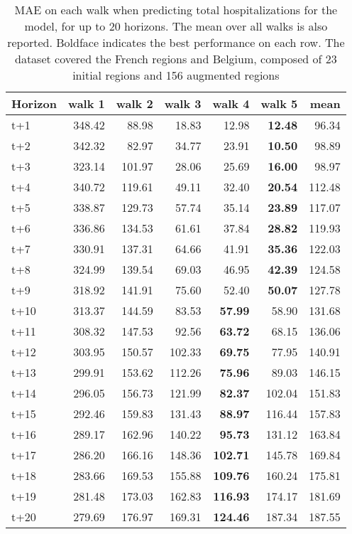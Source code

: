 \begin{table}[H]
\centering
\caption{MAE on each walk when predicting total hospitalizations for the model, for up to 20 horizons. The mean over all walks is also reported. Boldface indicates the best performance on each row. The dataset covered the French regions and Belgium, composed of 23 initial regions and 156 augmented regions }
\label{tab:MAE_walk_encoder_decoder}
\begin{tabular}{lrrrrrr}
\toprule
Horizon &  walk 1 &  walk 2 &  walk 3 &  walk 4 &  walk 5 &   mean \\
\midrule
t+1  & 348.42  & 88.98  & 18.83  & 12.98  & \textbf{12.48}  & 96.34  \\
t+2  & 342.32  & 82.97  & 34.77  & 23.91  & \textbf{10.50}  & 98.89  \\
t+3  & 323.14  & 101.97  & 28.06  & 25.69  & \textbf{16.00}  & 98.97  \\
t+4  & 340.72  & 119.61  & 49.11  & 32.40  & \textbf{20.54}  & 112.48  \\
t+5  & 338.87  & 129.73  & 57.74  & 35.14  & \textbf{23.89}  & 117.07  \\
t+6  & 336.86  & 134.53  & 61.61  & 37.84  & \textbf{28.82}  & 119.93  \\
t+7  & 330.91  & 137.31  & 64.66  & 41.91  & \textbf{35.36}  & 122.03  \\
t+8  & 324.99  & 139.54  & 69.03  & 46.95  & \textbf{42.39}  & 124.58  \\
t+9  & 318.92  & 141.91  & 75.60  & 52.40  & \textbf{50.07}  & 127.78  \\
t+10  & 313.37  & 144.59  & 83.53  & \textbf{57.99}  & 58.90  & 131.68  \\
t+11  & 308.32  & 147.53  & 92.56  & \textbf{63.72}  & 68.15  & 136.06  \\
t+12  & 303.95  & 150.57  & 102.33  & \textbf{69.75}  & 77.95  & 140.91  \\
t+13  & 299.91  & 153.62  & 112.26  & \textbf{75.96}  & 89.03  & 146.15  \\
t+14  & 296.05  & 156.73  & 121.99  & \textbf{82.37}  & 102.04  & 151.83  \\
t+15  & 292.46  & 159.83  & 131.43  & \textbf{88.97}  & 116.44  & 157.83  \\
t+16  & 289.17  & 162.96  & 140.22  & \textbf{95.73}  & 131.12  & 163.84  \\
t+17  & 286.20  & 166.16  & 148.36  & \textbf{102.71}  & 145.78  & 169.84  \\
t+18  & 283.66  & 169.53  & 155.88  & \textbf{109.76}  & 160.24  & 175.81  \\
t+19  & 281.48  & 173.03  & 162.83  & \textbf{116.93}  & 174.17  & 181.69  \\
t+20  & 279.69  & 176.97  & 169.31  & \textbf{124.46}  & 187.34  & 187.55  \\

\bottomrule
\end{tabular}
\end{table}
